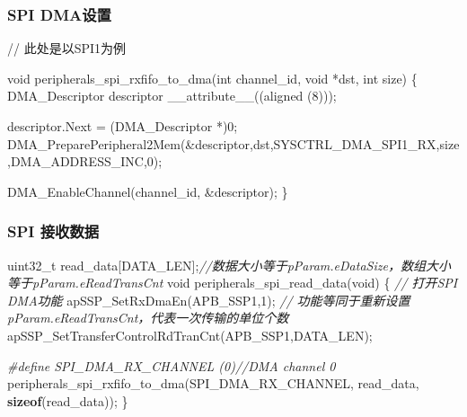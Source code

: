 \documentclass[
  12pt,
]{book}
\newenvironment{Shaded}{\begin{snugshade}}{\end{snugshade}}
\newcommand{\CommentTok}[1]{\textcolor[rgb]{0.56,0.35,0.01}{\textit{#1}}}
\newcommand{\DataTypeTok}[1]{\textcolor[rgb]{0.13,0.29,0.53}{#1}}
\newcommand{\DecValTok}[1]{\textcolor[rgb]{0.00,0.00,0.81}{#1}}
\newcommand{\KeywordTok}[1]{\textcolor[rgb]{0.13,0.29,0.53}{\textbf{#1}}}
\newcommand{\NormalTok}[1]{#1}
\newcommand{\PreprocessorTok}[1]{\textcolor[rgb]{0.56,0.35,0.01}{\textit{#1}}}
\begin{document}
\hypertarget{spi-dmaux8bbeux7f6e-1}{%
\subsubsection{SPI DMA设置}\label{spi-dmaux8bbeux7f6e-1}}

// 此处是以SPI1为例

\begin{Shaded}
\begin{Highlighting}[]
\DataTypeTok{void}\NormalTok{ peripherals_spi_rxfifo_to_dma(}\DataTypeTok{int}\NormalTok{ channel_id, }\DataTypeTok{void}\NormalTok{ *dst, }\DataTypeTok{int}\NormalTok{ size)}
\NormalTok{\{}
\NormalTok{    DMA_Descriptor descriptor __attribute__((aligned (}\DecValTok{8}\NormalTok{)));}

\NormalTok{    descriptor.Next = (DMA_Descriptor *)}\DecValTok{0}\NormalTok{;}
\NormalTok{    DMA_PreparePeripheral2Mem(&descriptor,dst,SYSCTRL_DMA_SPI1_RX,size,DMA_ADDRESS_INC,}\DecValTok{0}\NormalTok{);}

\NormalTok{    DMA_EnableChannel(channel_id, &descriptor);}
\NormalTok{\}}
\end{Highlighting}
\end{Shaded}

\hypertarget{spi-ux63a5ux6536ux6570ux636e-1}{%
\subsubsection{SPI 接收数据}\label{spi-ux63a5ux6536ux6570ux636e-1}}

\begin{Shaded}
\begin{Highlighting}[]
\DataTypeTok{uint32_t}\NormalTok{ read_data[DATA_LEN];}\CommentTok{//数据大小等于pParam.eDataSize，数组大小等于pParam.eReadTransCnt}
\DataTypeTok{void}\NormalTok{ peripherals_spi_read_data(}\DataTypeTok{void}\NormalTok{)}
\NormalTok{\{}
    \CommentTok{// 打开SPI DMA功能}
\NormalTok{    apSSP_SetRxDmaEn(APB_SSP1,}\DecValTok{1}\NormalTok{);}
    \CommentTok{// 功能等同于重新设置pParam.eReadTransCnt，代表一次传输的单位个数}
\NormalTok{    apSSP_SetTransferControlRdTranCnt(APB_SSP1,DATA_LEN);}
    
    \PreprocessorTok{#define SPI_DMA_RX_CHANNEL   (0)}\CommentTok{//DMA channel 0}
\NormalTok{    peripherals_spi_rxfifo_to_dma(SPI_DMA_RX_CHANNEL, read_data, }\KeywordTok{sizeof}\NormalTok{(read_data));}
\NormalTok{\}}
\end{Highlighting}
\end{Shaded}
\end{document}
